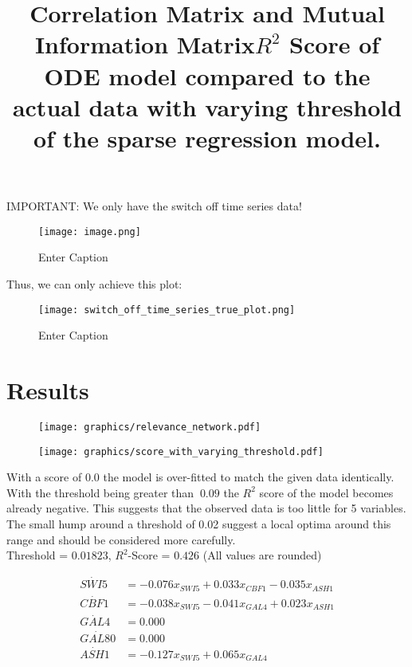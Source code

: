 \documentclass{article}
\begin{document}
IMPORTANT: We only have the switch off time series data!
\begin{figure}
    \centering
    \texttt{[image: image.png]}
    \caption{Enter Caption}
    \label{fig:enter-label}
\end{figure}

Thus, we can only achieve this plot:
\begin{figure}
    \centering
    \texttt{[image: switch\_off\_time\_series\_true\_plot.png]}
    \caption{Enter Caption}
    \label{fig:enter-label}
\end{figure}

\subsection{}

\section{Results}

\begin{figure}[thb!]
\texttt{[image: graphics/relevance\_network.pdf]}
\centering
\title{Correlation Matrix and Mutual Information Matrix}
\label{corr_mi_matrix}
\end{figure}


\begin{figure}[thb!]
\texttt{[image: graphics/score\_with\_varying\_threshold.pdf]}
\centering
\title{$R^2$ Score of ODE model compared to the actual data with varying threshold of the sparse regression model.}
\label{score_by_threshold}
\end{figure}

With a score of 0.0 the model is over-fitted to match the given data identically. With the threshold being greater than $~0.09$ the $R^2$ score of the model becomes already negative. This suggests that the observed data is too little for 5 variables.
The small hump around a threshold of 0.02 suggest a local optima around this range and should be considered more carefully. \\

\hline
Threshold = $0.01823$, $R^2$-Score = $0.426$  (All values are rounded)

\begin{align*}
\dot{SWI5} &= -0.076 x_{SWI5} + 0.033 x_{CBF1} - 0.035 x_{ASH1} \\
\dot{CBF1} &= -0.038 x_{SWI5} - 0.041 x_{GAL4} + 0.023 x_{ASH1} \\
\dot{GAL4} &= 0.000 \\
\dot{GAL80} &= 0.000 \\
\dot{ASH1} &= -0.127 x_{SWI5} + 0.065 x_{GAL4}
\end{align*}
\end{document}
